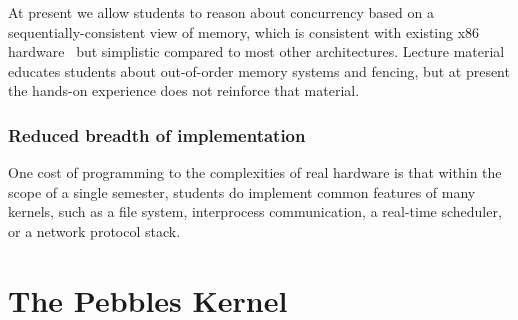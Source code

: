 At present we allow students
to reason about concurrency based on a
sequentially-consistent view of
memory, which is consistent with
existing x86 hardware~\cite{SewellSOZNM:x86tso-cacm10}
but simplistic compared to most other
architectures.
Lecture material educates students about
out-of-order memory systems
and fencing,
but at present the hands-on experience does not
reinforce that material.

\subsubsection{Reduced breadth of implementation}

One cost of programming to the complexities of
real hardware is that
within the scope of a single semester,
students do 
implement common features of many kernels,
such as a file system, interprocess communication,
a real-time scheduler,
or a network protocol stack.

\section{The Pebbles Kernel}
\label{sec:pebbles}

